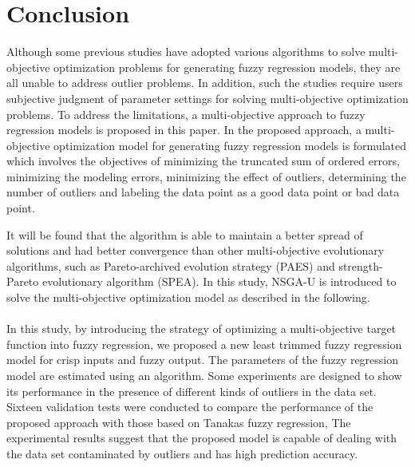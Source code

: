 \documentclass{IJFS}
\begin{document}



\section{Conclusion}\label{Conc}
Although some previous studies have adopted various algorithms to solve multi-objective optimization problems for generating fuzzy regression models, they are all unable to address  outlier problems.
In addition, such the studies require users subjective judgment of parameter settings for solving multi-objective optimization problems.
To address the limitations, a multi-objective approach to fuzzy regression models is proposed in this paper.
In the proposed approach, a multi-objective optimization model for generating fuzzy regression models is formulated which involves the objectives of minimizing the truncated sum of ordered errors, minimizing the modeling errors, minimizing the effect of outliers, determining the number of outliers and labeling the data point as a good data point or bad data point.

It will be found that the algorithm  is able to maintain a better spread of solutions and had better
convergence than other multi-objective evolutionary algorithms, such as Pareto-archived
evolution strategy (PAES) and strength-Pareto evolutionary algorithm (SPEA). In this study,
NSGA-U is introduced to solve the multi-objective optimization model as described in the following.\\\\



In this study, by introducing the strategy of optimizing a multi-objective target function into fuzzy regression, we proposed a new least trimmed fuzzy regression model for crisp inputs and fuzzy output.
The parameters of the   fuzzy regression model are estimated using an   algorithm.
Some experiments are designed to show its performance in the presence of different kinds of outliers in the data set.
Sixteen validation tests were conducted to compare the performance of the proposed approach with those based on Tanakas fuzzy regression,
The experimental results suggest that the proposed model is capable of dealing with the data set contaminated by outliers and has high prediction accuracy.
\end{document}
